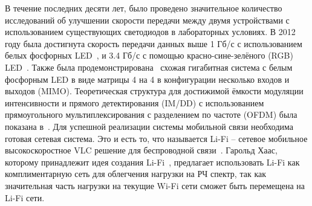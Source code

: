 В течение последних десяти лет, было проведено значительное количество исследований об улучшении скорости передачи между двумя устройствами с использованием существующих светодиодов в лабораторных условиях. В 2012 году была достигнута скорость передачи данных выше 1 Гб/с с использованием белых фосфорных LED~\cite{Khalid2012}, и 3.4 Гб/с с помощью красно-сине-зелёного (RGB) LED~\cite{Cossu2012}. Также была продемонстрирована~\cite{Azhar2013} схожая гигабитная система с белым фосфорным LED в виде матрицы 4 на 4 в конфигурации несколько входов и выходов (MIMO). Теоретическая структура для достижимой ёмкости модуляции интенсивности и прямого детектирования (IM/DD) с использованием прямоугольного мультиплексирования с разделением по частоте (OFDM) была показана в~\cite{Dimitrov2013}. Для успешной реализации системы мобильной связи необходима готовая сетевая система. Это и есть то, что называется Li-Fi \--- сетевое мобильное высокоскоростное VLC решение для беспроводной связи~\cite{Harald2014}. Гарольд Хаас, которому принадлежит идея создания Li-Fi~\cite{Haas16}, предлагает использовать Li-Fi как комплиментарную сеть для облегчения нагрузки на РЧ спектр, так как значительная часть нагрузки на текущие Wi-Fi сети сможет быть перемещена на Li-Fi сети. 

